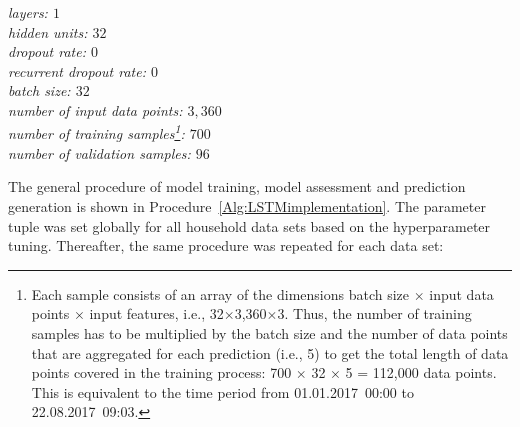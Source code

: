\begin{multicols}{2}
    \indent\textit{layers: $1$\\
    \indent hidden units: $32$\\
    \indent dropout rate: $0$\\
    \indent recurrent dropout rate: $0$\\
    \indent batch size: $32$\\
    \indent number of input data points: $3,360$\\
    \indent number of training samples\footnote{Each sample consists of an array of the dimensions batch size $\times$ input data points $\times$ input features, i.e., 32$\times$3,360$\times$3. Thus, the number of training samples has to be multiplied by the batch size and the number of data points that are aggregated for each prediction (i.e., 5) to get the total length of data points covered in the training process: 700 $\times$ 32 $\times$ 5 = 112,000 data points. This is equivalent to the time period from 01.01.2017~00:00 to 22.08.2017~09:03.}: $700$ \\
    \indent number of validation samples: $96$}
\end{multicols}

The general procedure of model training, model assessment and prediction generation is shown in Procedure~\ref{Alg:LSTMimplementation}. The parameter tuple was set globally for all household data sets based on the hyperparameter tuning. Thereafter, the same procedure was repeated for each data set:

